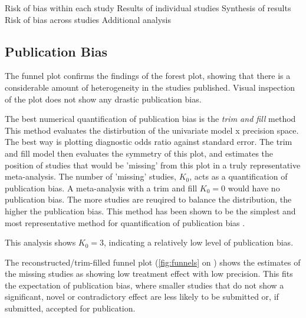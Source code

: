 Risk of bias within each study
Results of individual studies
Synthesis of results
Risk of bias across studies
Additional analysis

\subsection{Publication Bias}

The funnel plot confirms the findings of the forest plot, showing that there is a considerable amount of heterogeneity in the studies published.
Visual inspection of the plot does not show any drastic publication bias.

The best numerical quantification of publication bias is the \emph{trim and fill} method \cite{duvalTrimFillSimple2000}
This method evaluates the distirbution of the univariate model x precision space.
The best way is plotting diagnostic odds ratio against standard error.
The trim and fill model then evaluates the symmetry of this plot, and estimates the position of studies that would be 'missing' from this plot in a truly representative meta-analysis.
The number of 'missing' studies, $K_0$, acts as a quantification of publication bias.
A meta-analysis with a trim and fill $K_0 = 0$ would have no publication bias.
The more studies are reuqired to balance the distribution, the higher the publication bias.
This method has been shown to be the simplest and most representative method for quantification of publication bias \cite{burknerTestingPublicationBias2014}.


This analysis shows $K_0 = 3$, indicating a relatively low level of publication bias.

The reconstructed/trim-filled funnel plot (\cref{fig:funnels} on ) shows the estimates of the missing studies as showing low treatment effect with low precision.
This fits the expectation of publication bias, where smaller studies that do not show a significant, novel or contradictory effect are less likely to be submitted or, if submitted, accepted for publication.
